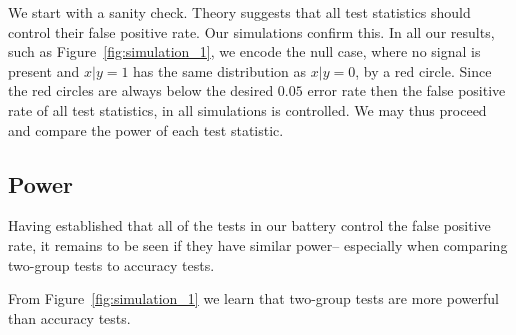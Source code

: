 \documentclass[journal]{IEEEtran}
\begin{document}
We start with a sanity check. 
Theory suggests that all test statistics should control their false positive rate. 
Our simulations confirm this.
In all our results, such as Figure~\ref{fig:simulation_1}, we encode the null case, where no signal is present and $x|y=1$ has the same distribution as $x|y=0$, by a red circle. 
Since the red circles are always below the desired $0.05$ error rate then the false positive rate of all test statistics, in all simulations is controlled. 
We may thus proceed and compare the power of each test statistic. 






\subsection{Power}
\label{sec:power}

Having established that all of the tests in our battery control the false positive rate, it remains to be seen if they have similar power-- especially when comparing two-group tests to accuracy tests. 

From Figure~\ref{fig:simulation_1} we learn that two-group tests are more powerful than accuracy tests.
\end{document}

